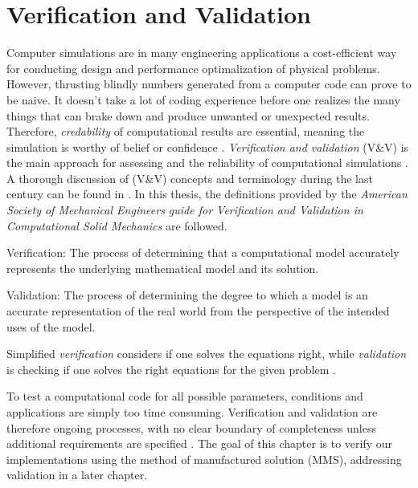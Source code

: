 \chapter{Verification and Validation}
 Computer simulations are in many engineering applications a cost-efficient way for conducting design and performance optimalization of physical problems. However, thrusting blindly numbers generated from a computer code can prove to be naive. It doesn't take a lot of coding experience before one realizes the many things that can brake down and produce unwanted or unexpected results. 
Therefore, \textit{credability} of computational results are essential, meaning the simulation is worthy of belief or confidence \cite{Oberkampf2010}. \textit{Verification and validation} (V\&V) is the main approach for assessing and the reliability of computational simulations \cite{Sommerville2006}.  A thorough discussion  of (V\&V) concepts and terminology during the last century can be found in \cite{Oberkampf2010}. In this thesis, the definitions provided by the \textit{American Society of Mechanical Engineers guide for Verification and Validation in Computational Solid Mechanics}  \cite{Schwer2006} are followed.

\begin{defn}
Verification: The process of determining that a computational model accurately represents
the underlying mathematical model and its solution. 
\end{defn}

\begin{defn}
Validation: The process of determining the degree to which a model is an accurate
representation of the real world from the perspective of the intended uses of the model. 
\end{defn}

Simplified \textit{verification} considers if one solves the equations right, while \textit{validation} is checking if one solves the right equations for the given problem \cite{Roache}.

 To test a computational code for all possible parameters, conditions and applications are simply too time consuming.   Verification and validation are therefore ongoing processes, with no clear boundary of completeness unless additional requirements are specified \cite{Roache}. The goal of this chapter is to verify our implementations using the method of manufactured solution  (MMS), addressing validation in a later chapter.

